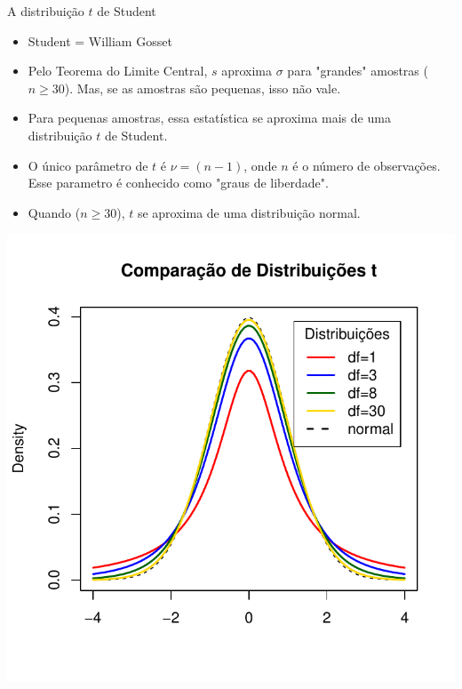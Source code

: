 \documentclass{beamer}\usepackage[]{graphicx}\usepackage[]{color}
\newenvironment{knitrout}{}{} %
\renewenvironment{knitrout}{\setlength{\topsep}{0mm}}{}
\begin{document}
\begin{frame}{A distribuição $t$ de Student}

\begin{itemize}
  \item Student = William Gosset
  \vfill
  \item Pelo Teorema do Limite Central, $s$ aproxima $\sigma$ para "grandes" amostras ($n \geq 30$). Mas, se as amostras são pequenas, isso não vale.
  \vfill
  \item Para pequenas amostras, essa estatística se aproxima mais de uma distribuição $t$ de Student.
  \vfill
  \item O único parâmetro de $t$ é $\nu = (n-1)$, onde $n$ é o número de observações. Esse parametro é conhecido como "graus de liberdade".
  \vfill
  \item Quando ($n \geq 30$), $t$ se aproxima de uma distribuição normal.
  \vfill
\end{itemize}

\end{frame}


\begin{frame}[fragile]

\begin{knitrout}
\color{fgcolor}
\includegraphics[width=0.8\linewidth]{figure/unnamed-chunk-11-1} 

\end{knitrout}



\end{frame}
\end{document}
